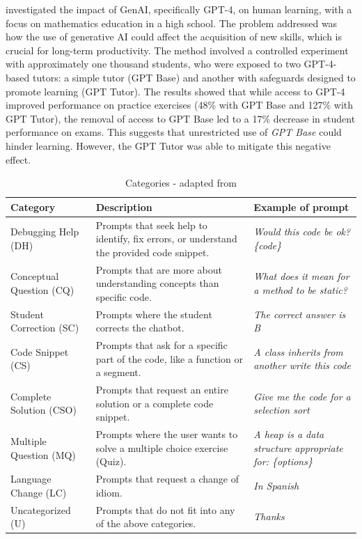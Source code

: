 \documentclass[a4paper,twoside]{article}
\begin{document}
\cite{Bastani24} investigated the impact of GenAI, specifically GPT-4, on human
learning, with a focus on mathematics education in a high school. The problem
addressed was how the use of generative AI could affect the acquisition of new
skills, which is crucial for long-term productivity. The method involved a
controlled experiment with approximately one thousand students, who were exposed
to two GPT-4-based tutors: a simple tutor (GPT Base) and another with safeguards
designed to promote learning (GPT Tutor). The results showed that while access
to GPT-4 improved performance on practice exercises (48\% with GPT Base and
127\% with GPT Tutor), the removal of access to GPT Base led to a 17\% decrease
in student performance on exams. This suggests that unrestricted use of
\textit{GPT Base} could hinder learning. However, the GPT Tutor was able to
mitigate this negative effect.
\begin{table}[htbp]
  \caption{Categories - adapted from \cite{Ghimire24}}
  \begin{center}
    \renewcommand{\arraystretch}{1.1} %
    \begin{tabular}{p{3.8cm} p{6cm} p{4.5cm}} %
      \hline
      \textbf{Category} & \textbf{Description} & \textbf{Example of prompt} \\
      \hline
      Debugging Help (DH) & Prompts that seek help to identify, fix errors, or understand the provided code snippet. & \textit{Would this code be ok? \{code\}} \\
      Conceptual Question (CQ) & Prompts that are more about understanding concepts than specific code. & \textit{What does it mean for a method to be static?} \\
      Student Correction (SC) & Prompts where the student corrects the chatbot. & \textit{The correct answer is B} \\
      Code Snippet  (CS) & Prompts that ask for a specific part of the code, like a function or a segment. & \textit{A class inherits from another write this code} \\
      Complete Solution (CSO) & Prompts that request an entire solution or a complete code snippet. & \textit{Give me the code for a selection sort} \\
      Multiple Question (MQ) & Prompts where the user wants to solve a multiple choice exercise (Quiz). & \textit{A heap is a data structure appropriate for: \{options\}} \\
      Language Change (LC) & Prompts that request a change of idiom. & \textit{In Spanish} \\
      Uncategorized (U) & Prompts that do not fit into any of the above categories. & \textit{Thanks} \\
      \hline
    \end{tabular}
    \label{tab:categories}
  \end{center}
\end{table}
\end{document}
